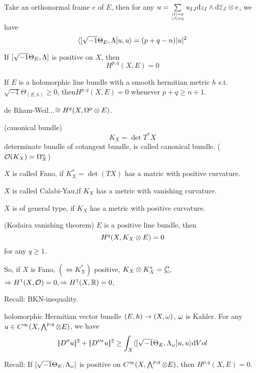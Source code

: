 \begin{cor}
Take an orthonormal frame $e$ of $E$, then
for any $u=\sum \limits_{|I|=p\atop|J|=q}u_{IJ}\mathrm{d} z_I\wedge\mathrm{d}\overline{z}_J\otimes e$, we have
$$
  \langle 
  [\sqrt{-1}\Theta_E,\Lambda
  ]u
  ,u \rangle
=(p+q-n)|u|^2
$$
\end{cor}

\begin{thm}
If $[\sqrt{-1}\Theta_E,\Lambda]$ is positive on $X$,
then
$$H^{p,q}(X,E)=0$$
\end{thm}

\begin{thm}If $E$ is a holomorphic line bundle
with a smooth hermitian metric $h$ s.t. $\sqrt{-1}\Theta_{(E,h)}\geq 0$,
then$H^{p,q}(X,E)=0$ whenever $p+q\geq n+1$.
\end{thm}
de Rham-Weil...$\cong H^q(X,\Omega^p\otimes E)$.

\begin{definition}(canonical bundle)
$$K_X=\det T^*X$$
determinate bundle of cotangent bundle,
is called canonical bundle.
($\mathcal{O}(K_X)=\Omega_X^n$)
\end{definition}


\begin{definition}
$X$ is called Fano, if $K_X^*=\det(TX)$ has a matric with positive curvature.

$X$ is called Calabi-Yau,if $K_X$ has a metric with vanishing curvature.

$X$ is of general type, if $K_X$ has a metric with positive curvature.
\end{definition}


\begin{cor}(Kodaira vanishing theorem)
$E$ is a positive line bundle, then
$$H^q(X,K_X\otimes E)=0$$
for any $q\geq 1$.
\end{cor}

So, if $X$ is Fano, $(\iff K_X^*)$ positive,
$K_X\otimes K_X^*=\underline{\mathbb{C}}$,
$\Rightarrow H^1(X,\mathcal{O})=0,\Rightarrow H^1(X,\mathbb{R})=0$,


Recall: BKN-inequality.

holomorphic Hermitian vector bundle $(E,h)\to (X,\omega)$, $\omega$ is Kahler.
For any $u\in C^\infty(X,\bigwedge\nolimits^{p,q}\otimes E)$, we have
$$
  |\!|D''u|\!|^2+|\!|D''^*u|\!|^2
\geq
  \int_X
    \langle [\sqrt{-1}\Theta_E,\Lambda_\omega]u,u \rangle
    \mathrm{d} Vol
$$

Recall: If $[\sqrt{-1}\Theta_E,\Lambda_\omega]$ is positive on
$C^\infty(X,\bigwedge\nolimits^{p,q}\otimes E)$, then
$H^{p,q}(X,E)=0$.

